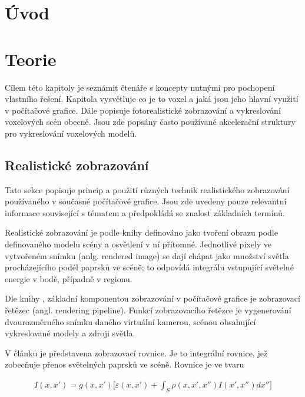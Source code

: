 

\chapter{Úvod}
\label{uvod}

\chapter{Teorie}
\label{teorie}
Cílem této kapitoly je seznámit čtenáře s koncepty nutnými pro pochopení vlastního řešení. Kapitola vysvětluje co je to voxel a jaká jsou jeho hlavní využití v počítačové grafice. Dále popisuje fotorealistické zobrazování a vykreslování voxelových scén obecně. Jsou zde popsány často používané akcelerační struktury pro vykreslování voxelových modelů.

\section{Realistické zobrazování}
Tato sekce popisuje princip a použití různých technik realistického zobrazování používaného v současné počítačové grafice. Jsou zde uvedeny pouze relevantní informace související s tématem a předpokládá se znalost základních termínů.

Realistické zobrazování je podle knihy \cite{gfx_principles_practice} definováno jako tvoření obrazu podle definovaného modelu scény a osvětlení v ní přítomné. Jednotlivé pixely ve vytvořeném snímku (anlg. rendered image) se dají chápat jako množství světla procházejícího podél paprsků ve scéně; to odpovídá integrálu vstupující světelné energie v bodě, případně v regionu.

Dle knihy \cite{real_time_render}, základní komponentou zobrazování v počítačové grafice je zobrazovací řetězec (angl. rendering pipeline). Funkcí zobrazovacího řetězce je vygenerování dvourozměrného snímku daného virtuální kamerou, scénou obsahující vykreslované modely a zdroji světla.

V článku \cite{render_eq} je představena zobrazovací rovnice. Je to integrální rovnice, jež zobecňuje přenos světelných paprsků ve scéně. Rovnice je ve tvaru

\begin{equation} \label{eq:render}
	\begin{gathered}
		I(x, x') = g(x, x') \Big[\varepsilon(x, x') + \int_S\rho(x, x', x'')I(x', x'')dx''\Big]
	\end{gathered}
\end{equation}

